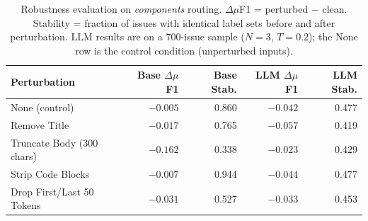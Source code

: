 \begin{table}[t]
\centering
\caption{Robustness evaluation on \emph{components} routing. $\Delta\mu$F1 = perturbed $-$ clean. Stability = fraction of issues with identical label sets before and after perturbation. LLM results are on a 700-issue sample ($N{=}3$, $T{=}0.2$); the None row is the control condition (unperturbed inputs).}
\label{tab:robustness}
\footnotesize
\setlength{\tabcolsep}{3pt}
\renewcommand{\arraystretch}{1.05}
\begin{tabularx}{\columnwidth}{l r r r r}
\toprule
\textbf{Perturbation} & \textbf{Base $\Delta\mu$F1} & \textbf{Base Stab.} & \textbf{LLM $\Delta\mu$F1} & \textbf{LLM Stab.} \\
\midrule
None (control) & $-0.005$ & 0.860 & $-0.042$ & 0.477 \\
\midrule
Remove Title & $-0.017$ & 0.765 & $-0.057$ & 0.419 \\
Truncate Body (300 chars) & $-0.162$ & 0.338 & $-0.023$ & 0.429 \\
Strip Code Blocks & $-0.007$ & 0.944 & $-0.044$ & 0.477 \\
Drop First/Last 50 Tokens & $-0.031$ & 0.527 & $-0.033$ & 0.453 \\
\bottomrule
\end{tabularx}
\end{table}
